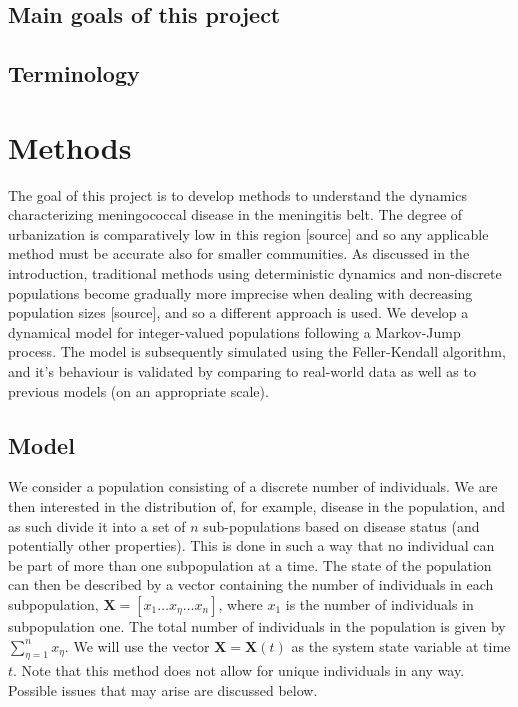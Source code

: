 \documentclass[10pt,a4paper]{article}
\begin{document}

\subsection{Main goals of this project}


\subsection{Terminology}

\section{Methods}

The goal of this project is to develop methods to understand the dynamics characterizing meningococcal disease in the meningitis belt. The degree of urbanization is comparatively low in this region [source] and so any applicable method must be accurate also for smaller communities. As discussed in the introduction, traditional methods using deterministic dynamics and non-discrete populations become gradually more imprecise when dealing with decreasing population sizes [source], and so a different approach is used. We develop a dynamical model for integer-valued populations following a Markov-Jump process. The model is subsequently simulated using the Feller-Kendall algorithm, and it's behaviour is validated by comparing to real-world data as well as to previous models (on an appropriate scale).


\subsection{Model}

We consider a population consisting of a discrete number of individuals. We are then interested in the distribution of, for example, disease in the population, and as such divide it into a set of $n$ sub-populations based on disease status (and potentially other properties). This is done in such a way that no individual can be part of more than one subpopulation at a time. The state of the population can then be described by a vector containing the number of individuals in each subpopulation, $\bm{X} = \left[ x_1 \ldots x_\eta \ldots x_n\right]$, where $x_1$ is the number of individuals in subpopulation one. The total number of individuals in the population is given by $\sum_{\eta = 1}^n x_{\eta}$. We will use the vector $\bm{X} = \bm{X} \left( t \right)$ as the system state variable at time $t$. Note that this method does not allow for unique individuals in any way. Possible issues that may arise are discussed below.
\end{document}

